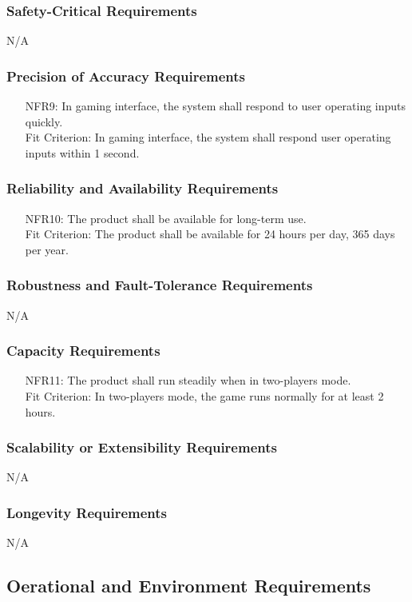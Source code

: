 \documentclass[12pt]{article}
\begin{document}
\subsubsection{Safety-Critical Requirements}
N/A
\subsubsection{Precision of Accuracy Requirements}
\begin{itemize}
\item[NFR9:] In gaming interface, the system shall respond to user operating inputs quickly.\\
Fit Criterion: In gaming interface, the system shall respond user operating inputs within 1 second.
\end{itemize}
\subsubsection{Reliability and Availability Requirements}
\begin{itemize}
\item[NFR10:] The product shall be available for long-term use. \\
Fit Criterion: The product shall be available for 24 hours per day, 365 days per year.
\end{itemize}
\subsubsection{Robustness and Fault-Tolerance Requirements}
N/A
\subsubsection{Capacity Requirements}
\begin{itemize}
\item[NFR11:] The product shall run steadily when in two-players mode.\\
Fit Criterion: In two-players mode, the game runs normally for at least 2 hours.
\end{itemize}
\subsubsection{Scalability or Extensibility Requirements}
N/A
\subsubsection{Longevity Requirements}
N/A
\subsection{Oerational and Environment Requirements}
\end{document}
